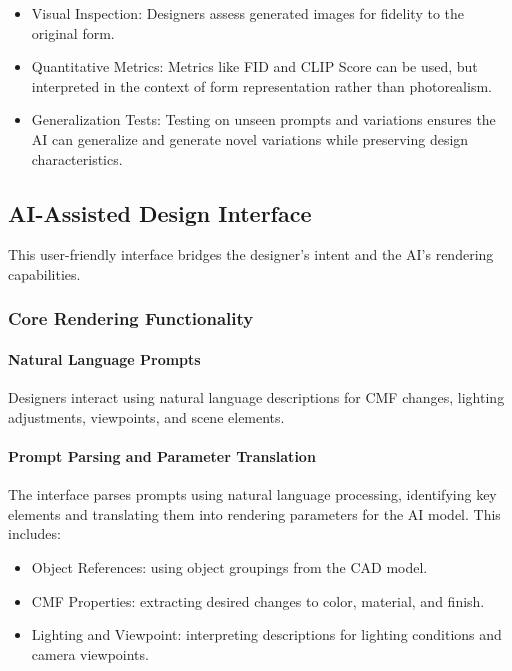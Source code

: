 \documentclass[12pt]{report}
\begin{document}
\begin{itemize}
    \item Visual Inspection: Designers assess generated images for fidelity to the original form.
    \item Quantitative Metrics: Metrics like FID and CLIP Score can be used, but interpreted in the context of form representation rather than photorealism.
    \item Generalization Tests: Testing on unseen prompts and variations ensures the AI can generalize and generate novel variations while preserving design characteristics.
\end{itemize}

\subsection{AI-Assisted Design Interface}
This user-friendly interface bridges the designer's intent and the AI's rendering capabilities.

\subsubsection{Core Rendering Functionality}

\paragraph{Natural Language Prompts}
Designers interact using natural language descriptions for CMF changes, lighting adjustments, viewpoints, and scene elements.

\paragraph{Prompt Parsing and Parameter Translation}
The interface parses prompts using natural language processing, identifying key elements and translating them into rendering parameters for the AI model. This includes:

\begin{itemize}
    \item Object References: using object groupings from the CAD model.
    \item CMF Properties: extracting desired changes to color, material, and finish.
    \item Lighting and Viewpoint: interpreting descriptions for lighting conditions and camera viewpoints.
\end{itemize}
\end{document}
